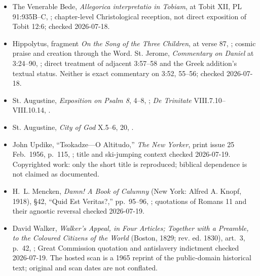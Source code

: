 \begin{deepstudy}
{\begin{itemize}
\item The Venerable Bede, \emph{Allegorica interpretatio in Tobiam}, at Tobit XII, PL 91:935B--C, ; chapter-level Christological reception, not direct exposition of Tobit 12:6; checked 2026-07-18.
\item Hippolytus, fragment \emph{On the Song of the Three Children}, at verse 87, ; cosmic praise and creation through the Word. St. Jerome, \emph{Commentary on Daniel} at 3:24--90, ; direct treatment of adjacent 3:57--58 and the Greek addition's textual status. Neither is exact commentary on 3:52, 55--56; checked 2026-07-18.
\item St. Augustine, \emph{Exposition on Psalm 8}, 4--8, ; \emph{De Trinitate} VIII.7.10--VIII.10.14, .
\item St. Augustine, \emph{City of God} X.5--6, 20, .
\item John Updike, ``Tsokadze---O Altitudo,'' \emph{The New Yorker}, print issue 25 Feb.~1956, p.~115, ; title and ski-jumping context checked 2026-07-19. Copyrighted work: only the short title is reproduced; biblical dependence is not claimed as documented.
\item H.~L. Mencken, \emph{Damn! A Book of Calumny} (New York: Alfred A. Knopf, 1918), §42, ``Quid Est Veritas?,'' pp.~95--96, ; quotations of Romans 11 and their agnostic reversal checked 2026-07-19.
\item David Walker, \emph{Walker's Appeal, in Four Articles; Together with a Preamble, to the Coloured Citizens of the World} (Boston, 1829; rev. ed. 1830), art.~3, p.~42, ; Great Commission quotation and antislavery indictment checked 2026-07-19. The hosted scan is a 1965 reprint of the public-domain historical text; original and scan dates are not conflated.
\end{itemize}
}


\end{deepstudy}
